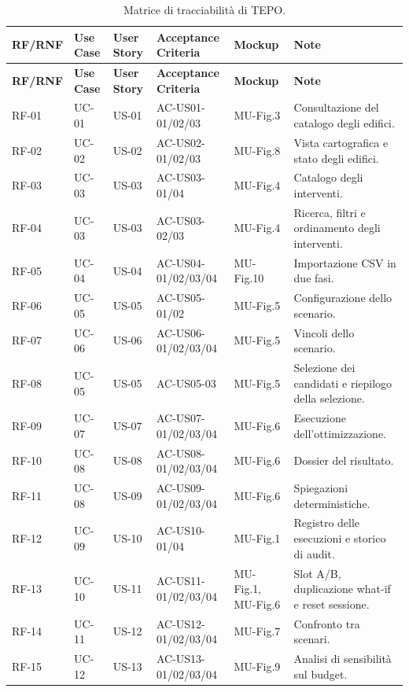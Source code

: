 \begingroup
\scriptsize
\setlength{\tabcolsep}{2.5pt}
\begin{longtable}{L{1.55cm} L{1.5cm} L{1.4cm} L{3.0cm} L{1.9cm} L{4.6cm}}
\caption{Matrice di tracciabilità di TEPO.}\\
\toprule
\textbf{RF/RNF} & \textbf{Use Case} & \textbf{User Story} & \textbf{Acceptance Criteria} & \textbf{Mockup} & \textbf{Note} \\
\midrule
\endfirsthead
\toprule
\textbf{RF/RNF} & \textbf{Use Case} & \textbf{User Story} & \textbf{Acceptance Criteria} & \textbf{Mockup} & \textbf{Note} \\
\midrule
\endhead
\bottomrule
\endfoot

RF-01 & UC-01 & US-01 & AC-US01-01/02/03 & MU-Fig.3 & Consultazione del catalogo degli edifici. \\
RF-02 & UC-02 & US-02 & AC-US02-01/02/03 & MU-Fig.8 & Vista cartografica e stato degli edifici. \\
RF-03 & UC-03 & US-03 & AC-US03-01/04 & MU-Fig.4 & Catalogo degli interventi. \\
RF-04 & UC-03 & US-03 & AC-US03-02/03 & MU-Fig.4 & Ricerca, filtri e ordinamento degli interventi. \\
RF-05 & UC-04 & US-04 & AC-US04-01/02/03/04 & MU-Fig.10 & Importazione CSV in due fasi. \\
RF-06 & UC-05 & US-05 & AC-US05-01/02 & MU-Fig.5 & Configurazione dello scenario. \\
RF-07 & UC-06 & US-06 & AC-US06-01/02/03/04 & MU-Fig.5 & Vincoli dello scenario. \\
RF-08 & UC-05 & US-05 & AC-US05-03 & MU-Fig.5 & Selezione dei candidati e riepilogo della selezione. \\
RF-09 & UC-07 & US-07 & AC-US07-01/02/03/04 & MU-Fig.6 & Esecuzione dell'ottimizzazione. \\
RF-10 & UC-08 & US-08 & AC-US08-01/02/03/04 & MU-Fig.6 & Dossier del risultato. \\
RF-11 & UC-08 & US-09 & AC-US09-01/02/03/04 & MU-Fig.6 & Spiegazioni deterministiche. \\
RF-12 & UC-09 & US-10 & AC-US10-01/04 & MU-Fig.1 & Registro delle esecuzioni e storico di audit. \\
RF-13 & UC-10 & US-11 & AC-US11-01/02/03/04 & MU-Fig.1, MU-Fig.6 & Slot A/B, duplicazione what-if e reset sessione. \\
RF-14 & UC-11 & US-12 & AC-US12-01/02/03/04 & MU-Fig.7 & Confronto tra scenari. \\
RF-15 & UC-12 & US-13 & AC-US13-01/02/03/04 & MU-Fig.9 & Analisi di sensibilità sul budget. \\

\end{longtable}
